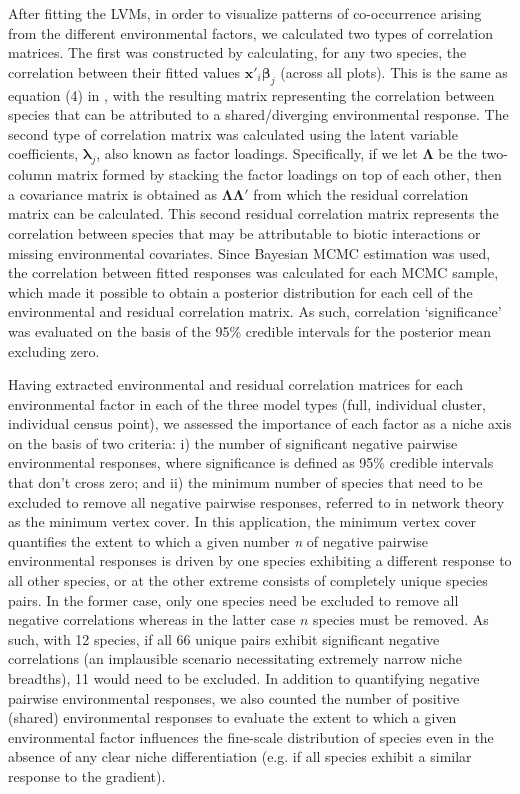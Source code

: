 After fitting the LVMs, in order to visualize patterns of co-occurrence arising from the different environmental factors, we calculated two types of correlation matrices. The first was constructed by calculating, for any two species, the correlation between their fitted values $\bm{x}'_i \bm{\beta}_j$ (across all plots). This is the same as equation (4) in \citet{Pollock2014}, with the resulting matrix representing the correlation between species that can be attributed to a shared/diverging environmental response. The second type of correlation matrix was calculated using the latent variable coefficients, $\bm{\lambda}_j$, also known as factor loadings. Specifically, if we let $\bm{\Lambda}$ be the two-column matrix formed by stacking the factor loadings on top of each other, then a covariance matrix is obtained as $\bm{\Lambda}\bm{\Lambda}'$ from which the residual correlation matrix can be calculated. This second residual correlation matrix represents the correlation between species that may be attributable to biotic interactions or missing environmental covariates. Since Bayesian MCMC estimation was used, the correlation between fitted responses was calculated for each MCMC sample, which made it possible to obtain a posterior distribution for each cell of the environmental and residual correlation matrix. As such, correlation `significance' was evaluated on the basis of the 95\% credible intervals for the posterior mean excluding zero. 


Having extracted environmental and residual correlation matrices for each environmental factor in each of the three model types (full, individual cluster, individual census point), we assessed the importance of each factor as a niche axis on the basis of two criteria: i) the number of significant negative pairwise environmental responses, where significance is defined as 95\% credible intervals that don't cross zero; and ii) the minimum number of species that need to be excluded to remove all negative pairwise responses, referred to in network theory as the minimum vertex cover. In this application, the minimum vertex cover quantifies the extent to which a given number \textit{n} of negative pairwise environmental responses is driven by one species exhibiting a different response to all other species, or at the other extreme consists of completely unique species pairs. In the former case, only one species need be excluded to remove all negative correlations whereas in the latter case $\textit{n}$ species must be removed. As such, with 12 species, if all 66 unique pairs exhibit significant negative correlations (an implausible scenario necessitating extremely narrow niche breadths), 11 would need to be excluded. In addition to quantifying negative pairwise environmental responses, we also counted the number of positive (shared) environmental responses to evaluate the extent to which a given environmental factor influences the fine-scale distribution of species even in the absence of any clear niche differentiation (e.g. if all species exhibit a similar response to the gradient). 

